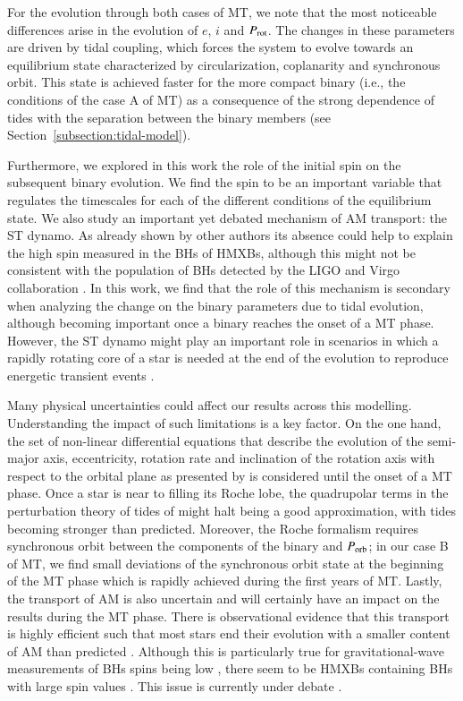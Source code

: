 \documentclass{aa}
\begin{document}
For the evolution through both cases of MT, we note that the most noticeable differences arise in the evolution of $e$, $i$ and
$P_{\rm rot}$. The changes in these parameters are driven by tidal coupling, which forces the system to evolve towards an equilibrium state
characterized by circularization, coplanarity and synchronous orbit. This state is achieved faster for the more compact binary (i.e., the
conditions of the case A of MT) as a consequence of the strong dependence of tides with the separation between the binary members (see
Section~\ref{subsection:tidal-model}).

Furthermore, we explored in this work the role of the initial spin on the subsequent binary evolution. We find the spin to be an important
variable that regulates the timescales for each of the different conditions of the equilibrium state. We also study an important yet
debated mechanism of AM transport: the ST dynamo. As already shown by other authors \citep{qin2019} its absence could help to explain the
high spin measured in the BHs of HMXBs, although this might not be consistent with the population of BHs detected by the LIGO and Virgo
collaboration \citep{abbott2021}. In this work, we find that the role of this mechanism is secondary when analyzing the change on the
binary parameters due to tidal evolution, although becoming important once a binary reaches the onset of a MT phase. However, the ST dynamo
might play an important role in scenarios in which a rapidly rotating core of a star is needed at the end of the evolution to reproduce
energetic transient events \citep{fuller2022}.

Many physical uncertainties could affect our results across this modelling. Understanding the impact of such limitations is a key factor.
On the one hand, the set of non-linear differential equations that describe the evolution of the semi-major axis, eccentricity, rotation
rate and inclination of the rotation axis with respect to the orbital plane as presented by \citet{repetto2014} is considered until the
onset of a MT phase. Once a star is near to filling its Roche lobe, the quadrupolar terms in the perturbation theory of tides of
\citet{hut1981} might halt being a good approximation, with tides becoming stronger than predicted. Moreover, the Roche formalism requires
synchronous orbit between the components of the binary and $P_{\rm orb}$; in our case B of MT, we find small deviations of the synchronous
orbit state at the beginning of the MT phase which is rapidly achieved during the first years of MT. Lastly, the transport of AM is also
uncertain and will certainly have an impact on the results during the MT phase. There is observational evidence that this transport is
highly efficient such that most stars end their evolution with a smaller content of AM than predicted
\citep{cantiello2014,fuller2014,spada2016,aerts2019,fuller2019,eggenberger2019,denhartogh2019}. Although this is particularly true for
gravitational-wave measurements of BHs spins being low \citep{abbott2021}, there seem to be HMXBs containing BHs with large spin values
\citep{miller2015}. This issue is currently under debate \citep{qin2019,bavera2020,fishbach2021,belczynski2021}.
\end{document}

